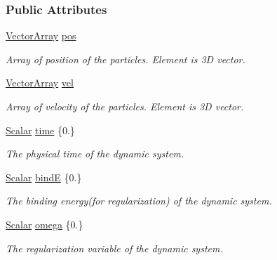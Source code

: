 \subsubsection*{Public Attributes}
\begin{DoxyCompactItemize}
\item 
\mbox{\hyperlink{classregu_dynamics_a86a05253d927e1716f3401e887aa5c8e}{Vector\+Array}} \mbox{\hyperlink{classregu_dynamics_a5e39085954d2dd9bcaa545a00880f442}{pos}}
\begin{DoxyCompactList}\small\item\em Array of position of the particles. Element is 3D vector. \end{DoxyCompactList}\item 
\mbox{\hyperlink{classregu_dynamics_a86a05253d927e1716f3401e887aa5c8e}{Vector\+Array}} \mbox{\hyperlink{classregu_dynamics_abf1176124ddfd429310f804491239801}{vel}}
\begin{DoxyCompactList}\small\item\em Array of velocity of the particles. Element is 3D vector. \end{DoxyCompactList}\item 
\mbox{\hyperlink{classregu_dynamics_a359c55370b4dee032396f0df86ad5fab}{Scalar}} \mbox{\hyperlink{classregu_dynamics_a05e287cf3f87cba248f69b5ff97a054d}{time}} \{0.\}
\begin{DoxyCompactList}\small\item\em The physical time of the dynamic system. \end{DoxyCompactList}\item 
\mbox{\hyperlink{classregu_dynamics_a359c55370b4dee032396f0df86ad5fab}{Scalar}} \mbox{\hyperlink{classregu_dynamics_a7e2b804745638810d38ed547487c26f2}{bindE}} \{0.\}
\begin{DoxyCompactList}\small\item\em The binding energy(for regularization) of the dynamic system. \end{DoxyCompactList}\item 
\mbox{\hyperlink{classregu_dynamics_a359c55370b4dee032396f0df86ad5fab}{Scalar}} \mbox{\hyperlink{classregu_dynamics_afef2a874c21e951765e50a497a411eae}{omega}} \{0.\}
\begin{DoxyCompactList}\small\item\em The regularization variable of the dynamic system. \end{DoxyCompactList}\end{DoxyCompactItemize}


